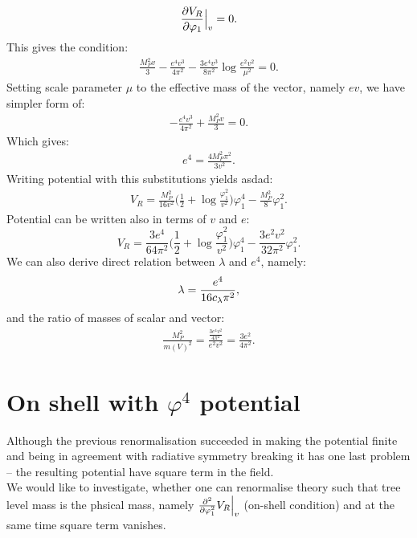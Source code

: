 \begin{align}
\frac{\partial V_R}{\partial \varphi_1} \Big|_v= 0.
\end{align}
This gives the condition:
\begin{align}
\frac{M_P^2v}{3}-\frac{e^4v^3}{4\pi^2}-\frac{3e^4v^3}{8\pi^2}\log\frac{e^2v^2}{\mu^2}=0.
\end{align}
Setting scale parameter $\mu$ to the effective mass of the vector, namely $ev$, we have 
simpler form of:
\begin{align}
-\frac{e^4v^3}{4\pi^2}+\frac{M_P^2v}{3}=0.
\end{align}
Which gives:
\begin{align}
e^4 = \frac{4M_P^2\pi^2}{3v^2}.
\end{align}
Writing potential with this substitutions yields asdad:
\begin{align}
V_R = \frac{M_P^2}{16v^2}\Big(\frac{1}{2}+\log\frac{\varphi_1^2}{v^2}\Big)\varphi_1^4- 
\frac{M_P^2}{8}\varphi_1^2.
\end{align}
Potential can be written also in terms of $v$ and $e$:
\begin{equation}\label{resulthalfhalf}
V_R=\frac{3e^4}{64\pi^2}\Big(\frac{1}{2}+\log\frac{\varphi_1^2}{v^2}\Big)\varphi_1^4- 
\frac{3e^2v^2}{32\pi^2}\varphi_1^2.
\end{equation}
We can also derive direct relation between $\lambda$ and $e^4$, namely:
\begin{align}
\lambda = \frac{e^4}{16c_\lambda\pi^2},
\end{align}
and the ratio of masses of scalar and vector:
\begin{align}
\frac{M_P^2}{m(V)^2} = \frac{\frac{3e^4v^2}{4\pi^2}}{e^2v^2} = \frac{3e^2}{4\pi^2}.
\end{align}
\section{On shell with \texorpdfstring{$\varphi^4$}{phi to the fourth} potential}\label{onshellphi4}
Although the previous renormalisation succeeded in making the potential finite and being in 
agreement with radiative symmetry breaking it has one last problem -- the resulting potential have 
square term in the field. \\

We would like to investigate, whether one can renormalise theory such that tree 
level mass is the phsical mass, namely $\frac{\partial^2 }{\partial \varphi_1^2}V_R\Big|_{v}$ (on-shell condition) and at the 
same time square term vanishes. \\

